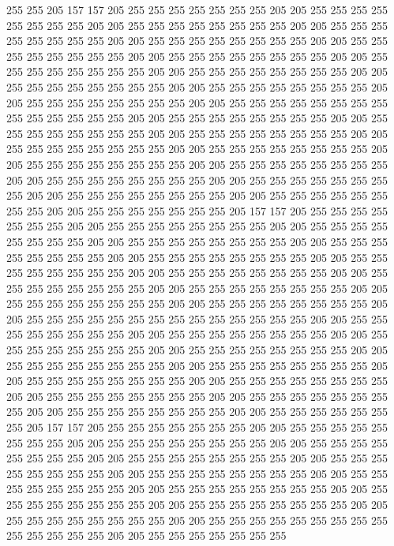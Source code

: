 255 255 205 157 157 205 255 255 255 255 255 255 255 205 205 255 255 255 255 255
255 255 255 205 205 255 255 255 255 255 255 255 255 205 205 255 255 255 255 255
255 255 255 205 205 255 255 255 255 255 255 255 255 205 205 255 255 255 255 255
255 255 255 205 205 255 255 255 255 255 255 255 255 205 205 255 255 255 255 255
255 255 255 205 205 255 255 255 255 255 255 255 255 205 205 255 255 255 255 255
255 255 255 205 205 255 255 255 255 255 255 255 255 205 205 255 255 255 255 255
255 255 255 205 205 255 255 255 255 255 255 255 255 255 255 255 255 255 255 205
205 255 255 255 255 255 255 255 255 205 205 255 255 255 255 255 255 255 255 205
205 255 255 255 255 255 255 255 255 205 205 255 255 255 255 255 255 255 255 205
205 255 255 255 255 255 255 255 255 205 205 255 255 255 255 255 255 255 255 205
205 255 255 255 255 255 255 255 255 205 205 255 255 255 255 255 255 255 255 205
205 255 255 255 255 255 255 255 255 205 205 255 255 255 255 255 255 255 255 205
205 255 255 255 255 255 255 255 255 205 205 255 255 255 255 255 255 255 205 157
157 205 255 255 255 255 255 255 255 205 205 255 255 255 255 255 255 255 255 205
205 255 255 255 255 255 255 255 255 205 205 255 255 255 255 255 255 255 255 205
205 255 255 255 255 255 255 255 255 205 205 255 255 255 255 255 255 255 255 205
205 255 255 255 255 255 255 255 255 205 205 255 255 255 255 255 255 255 255 205
205 255 255 255 255 255 255 255 255 205 205 255 255 255 255 255 255 255 255 205
205 255 255 255 255 255 255 255 255 205 205 255 255 255 255 255 255 255 255 205
205 255 255 255 255 255 255 255 255 255 255 255 255 255 255 205 205 255 255 255
255 255 255 255 255 205 205 255 255 255 255 255 255 255 255 205 205 255 255 255
255 255 255 255 255 205 205 255 255 255 255 255 255 255 255 205 205 255 255 255
255 255 255 255 255 205 205 255 255 255 255 255 255 255 255 205 205 255 255 255
255 255 255 255 255 205 205 255 255 255 255 255 255 255 255 205 205 255 255 255
255 255 255 255 255 205 205 255 255 255 255 255 255 255 255 205 205 255 255 255
255 255 255 255 255 205 205 255 255 255 255 255 255 255 205 157 157 205 255 255
255 255 255 255 255 205 205 255 255 255 255 255 255 255 255 205 205 255 255 255
255 255 255 255 255 205 205 255 255 255 255 255 255 255 255 205 205 255 255 255
255 255 255 255 255 205 205 255 255 255 255 255 255 255 255 205 205 255 255 255
255 255 255 255 255 205 205 255 255 255 255 255 255 255 255 205 205 255 255 255
255 255 255 255 255 205 205 255 255 255 255 255 255 255 255 205 205 255 255 255
255 255 255 255 255 205 205 255 255 255 255 255 255 255 255 205 205 255 255 255
255 255 255 255 255 255 255 255 255 255 255 205 205 255 255 255 255 255 255 255
